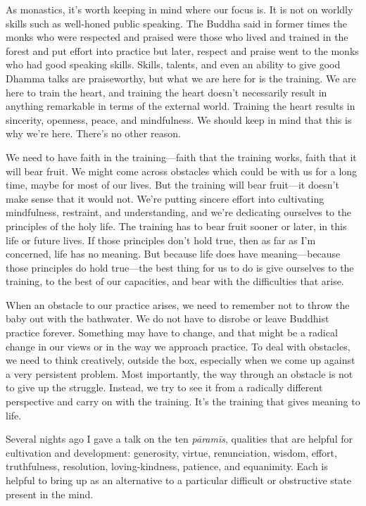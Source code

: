 
As monastics, it's worth keeping in mind where our focus is. It is not 
on worldly skills such as well-honed public speaking. The Buddha said 
in former times the monks who were respected and praised were those who 
lived and trained in the forest and put effort into practice but later, 
respect and praise went to the monks who had good speaking skills. 
Skills, talents, and even an ability to give good Dhamma talks are 
praiseworthy, but what we are here for is the training. We are here to 
train the heart, and training the heart doesn't necessarily result in 
anything remarkable in terms of the external world. Training the heart 
results in sincerity, openness, peace, and mindfulness. We should keep 
in mind that this is why we're here. There's no other reason.

We need to have faith in the training---faith that the training works, 
faith that it will bear fruit. We might come across obstacles which 
could be with us for a long time, maybe for most of our lives. But the 
training will bear fruit---it doesn't make sense that it would not. 
We're putting sincere effort into cultivating mindfulness, restraint, 
and understanding, and we're dedicating ourselves to the principles of 
the holy life. The training has to bear fruit sooner or later, in this 
life or future lives. If those principles don't hold true, then as far 
as I'm concerned, life has no meaning. But because life does have 
meaning---because those principles do hold true---the best thing for us 
to do is give ourselves to the training, to the best of our capacities, 
and bear with the difficulties that arise.

When an obstacle to our practice arises, we need to remember not to 
throw the baby out with the bathwater. We do not have to disrobe or 
leave Buddhist practice forever. Something may have to change, and that 
might be a radical change in our views or in the way we approach 
practice. To deal with obstacles, we need to think creatively, outside 
the box, especially when we come up against a very persistent problem. 
Most importantly, the way through an obstacle is not to give up the 
struggle. Instead, we try to see it from a radically different 
perspective and carry on with the training. It's the training that 
gives meaning to life.


Several nights ago I gave a talk on the ten \emph{pāramīs}, qualities 
that are helpful for cultivation and development: generosity, virtue, 
renunciation, wisdom, effort, truthfulness, resolution, 
loving-kindness, patience, and equanimity. Each is helpful to bring up 
as an alternative to a particular difficult or obstructive state 
present in the mind.

